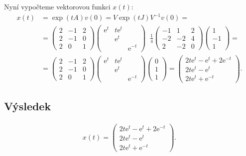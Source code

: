 \documentclass[]{article}
\newcommand{\e}{\mathrm{e}}
\begin{document}
Nyní vypočteme vektorovou funkci $x(t)$:
\begin{align*}
    x(t) &=
    \exp(tA) v(0) =
    V \exp(tJ) V^{-1} v(0) =
    \\
    &=
    \begin{pmatrix}
        2 & -1 & 2 \\
        2 & -1 & 0 \\
        2 &  0 & 1
    \end{pmatrix}
    \begin{pmatrix}
         \e^t & t\e^t &  \\
              & \e^t  &  \\
              &       & \e^{-t}
    \end{pmatrix}
    \;\;
    \frac{1}{4}
    \begin{pmatrix}
        -1 & 1 & 2 \\
        -2 & -2 & 4 \\
        2 & -2 & 0
    \end{pmatrix}
    \begin{pmatrix}
        1 \\ -1 \\ 1
    \end{pmatrix}
    =
    \\
    &=
    \begin{pmatrix}
        2 & -1 & 2 \\
        2 & -1 & 0 \\
        2 &  0 & 1
    \end{pmatrix}
    \begin{pmatrix}
         \e^t & t\e^t &  \\
              & \e^t  &  \\
              &       & \e^{-t}
    \end{pmatrix}
    \begin{pmatrix}
        0 \\ 1 \\ 1
    \end{pmatrix}
    =
    \begin{pmatrix}
        2t\e^t - \e^t + 2\e^{-t} \\
        2t\e^t - \e^t \\
        2t\e^t + \e^{-t}
    \end{pmatrix}.
\end{align*}

\subsection{Výsledek}
\begin{align*}
    x(t) =
    \begin{pmatrix}
        2t\e^t - \e^t + 2\e^{-t} \\
        2t\e^t - \e^t \\
        2t\e^t + \e^{-t}
    \end{pmatrix}.
\end{align*}
\end{document}
